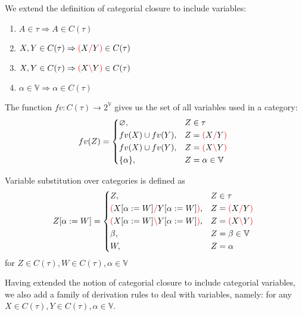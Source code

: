 \documentclass[main.tex]{subfiles}
\begin{document}
\begin{defn}
    We extend the definition of categorial closure to include variables:
    \begin{enumerate}
        \item \label{cvar:atomic} $A \in \tau \Rightarrow A \in C(\tau)$
        \item \label{cvar:right}  $X, Y \in C(\tau) \Rightarrow \textcolor{red}{(} X \textcolor{red}{/} Y \textcolor{red}{)} \in C(\tau)$
        \item \label{cvar:left}   $X, Y \in C(\tau) \Rightarrow \textcolor{red}{(} X \textcolor{red}{\backslash} Y \textcolor{red}{)} \in C(\tau)$
        \item \label{cvar:var}    $\alpha \in \mathbb{V} \Rightarrow \alpha \in C(\tau)$
    \end{enumerate}
\end{defn}

\begin{defn}
    The function $fv: C(\tau) \rightarrow 2^{\mathbb{V}}$ gives us the set of
    all variables used in a category:
    \[
        fv(Z) =
        \begin{cases*}
            \varnothing, & $Z \in \tau$ \\
            fv(X) \cup fv(Y), & $Z = \lp X \rc Y \rp$ \\
            fv(X) \cup fv(Y), & $Z = \lp X \lc Y \rp$ \\
            \{ \alpha \}, & $Z = \alpha \in \mathbb{V}$ \\
        \end{cases*}
    \]
\end{defn}
\begin{defn}
    Variable substitution over categories is defined as
    \[
        \subst{Z}{\alpha}{W} =
        \begin{cases*}
            Z, & $Z \in \tau$ \\
            \lp \subst{X}{\alpha}{W} \rc \subst{Y}{\alpha}{W} \rp, & $Z = \lp X \rc Y \rp$ \\
            \lp \subst{X}{\alpha}{W} \lc \subst{Y}{\alpha}{W} \rp, & $Z = \lp X \lc Y \rp$ \\
            \beta, & $Z = \beta \in \mathbb{V}$ \\
            W, & $Z = \alpha$ \\
        \end{cases*}
    \]
    for $Z \in C(\tau), W \in C(\tau), \alpha \in \mathbb{V}$
\end{defn}

Having extended the notion of categorial closure to include categorial variables,
we also add a family of derivation rules to deal with variables, namely:
for any $X \in C(\tau), Y \in C(\tau), \alpha \in \mathbb{V}$.
\end{document}
